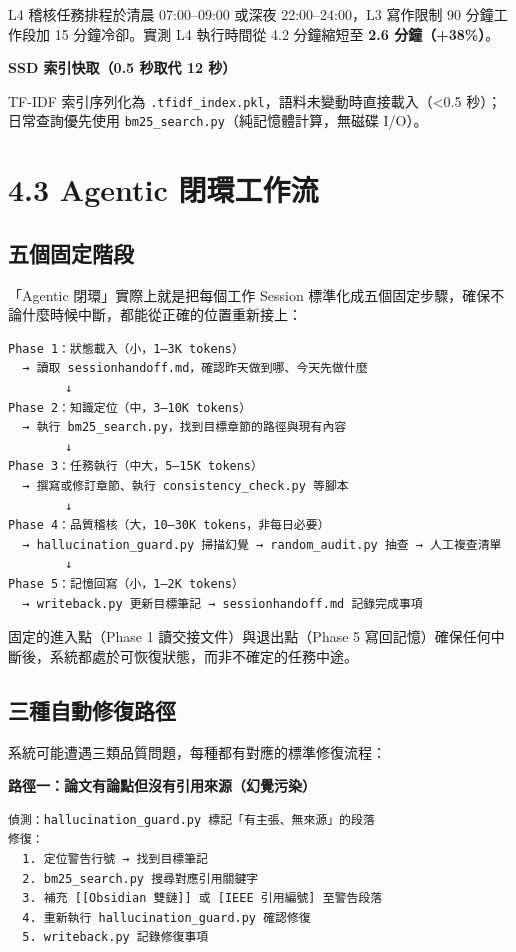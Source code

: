 L4 稽核任務排程於清晨 07:00--09:00 或深夜 22:00--24:00，L3 寫作限制 90
分鐘工作段加 15 分鐘冷卻。實測 L4 執行時間從 4.2 分鐘縮短至 \textbf{2.6
分鐘（+38\%）}。

\textbf{SSD 索引快取（0.5 秒取代 12 秒）}

TF-IDF 索引序列化為
\texttt{.tfidf\_index.pkl}，語料未變動時直接載入（\textless0.5
秒）；日常查詢優先使用 \texttt{bm25\_search.py}（純記憶體計算，無磁碟
I/O）。

\section{4.3 Agentic
閉環工作流}\label{agentic-ux9589ux74b0ux5de5ux4f5cux6d41}

\subsection{五個固定階段}\label{ux4e94ux500bux56faux5b9aux968eux6bb5}

「Agentic 閉環」實際上就是把每個工作 Session
標準化成五個固定步驟，確保不論什麼時候中斷，都能從正確的位置重新接上：

\begin{verbatim}
Phase 1：狀態載入（小，1–3K tokens）
  → 讀取 sessionhandoff.md，確認昨天做到哪、今天先做什麼
        ↓
Phase 2：知識定位（中，3–10K tokens）
  → 執行 bm25_search.py，找到目標章節的路徑與現有內容
        ↓
Phase 3：任務執行（中大，5–15K tokens）
  → 撰寫或修訂章節、執行 consistency_check.py 等腳本
        ↓
Phase 4：品質稽核（大，10–30K tokens，非每日必要）
  → hallucination_guard.py 掃描幻覺 → random_audit.py 抽查 → 人工複查清單
        ↓
Phase 5：記憶回寫（小，1–2K tokens）
  → writeback.py 更新目標筆記 → sessionhandoff.md 記錄完成事項
\end{verbatim}

固定的進入點（Phase 1 讀交接文件）與退出點（Phase 5
寫回記憶）確保任何中斷後，系統都處於可恢復狀態，而非不確定的任務中途。

\subsection{三種自動修復路徑}\label{ux4e09ux7a2eux81eaux52d5ux4feeux5fa9ux8defux5f91}

系統可能遭遇三類品質問題，每種都有對應的標準修復流程：

\textbf{路徑一：論文有論點但沒有引用來源（幻覺污染）}

\begin{verbatim}
偵測：hallucination_guard.py 標記「有主張、無來源」的段落
修復：
  1. 定位警告行號 → 找到目標筆記
  2. bm25_search.py 搜尋對應引用關鍵字
  3. 補充 [[Obsidian 雙鏈]] 或 [IEEE 引用編號] 至警告段落
  4. 重新執行 hallucination_guard.py 確認修復
  5. writeback.py 記錄修復事項
\end{verbatim}

